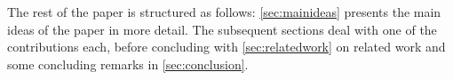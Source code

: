 The rest of the paper is structured as follows: \cref{sec:mainideas} presents the main ideas of the paper in more detail. The subsequent sections deal with one of the contributions each, before concluding with \cref{sec:relatedwork} on related work and some concluding remarks in \cref{sec:conclusion}.
